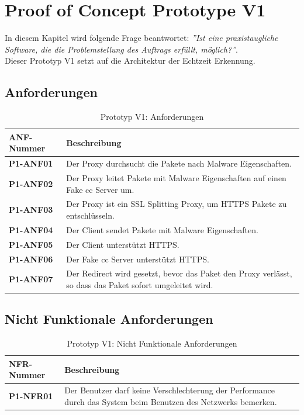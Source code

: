 \chapter{Proof of Concept Prototype V1}
\label{poc1:chapter}
In diesem Kapitel wird folgende Frage beantwortet: \textit{''Ist eine praxistaugliche Software, die die Problemstellung des Auftrags erfüllt, möglich?''}.\\

Dieser Prototyp V1 setzt auf die Architektur der Echtzeit Erkennung.


\begin{table}[H]
	\section{Anforderungen}
    \centering
	\begin{tabularx}{\textwidth}{| l | X |}
        \hline
        \textbf{ANF-Nummer} & \textbf{Beschreibung} \\ \hline
        \textbf{P1-ANF01} & Der Proxy durchsucht die Pakete nach Malware Eigenschaften. \\ \hline       
        \textbf{P1-ANF02} & Der Proxy leitet Pakete mit Malware Eigenschaften auf einen Fake \gls{cc} Server um. \\ \hline  
        \textbf{P1-ANF03} & Der Proxy ist ein SSL Splitting Proxy, um HTTPS Pakete zu entschlüsseln. \\ \hline
        \textbf{P1-ANF04} & Der Client sendet Pakete mit Malware Eigenschaften. \\ \hline       
        \textbf{P1-ANF05} & Der Client unterstützt HTTPS.  \\ \hline        
        \textbf{P1-ANF06} & Der Fake \gls{cc} Server unterstützt HTTPS.  \\ \hline  
        \textbf{P1-ANF07} & Der Redirect wird gesetzt, bevor das Paket den Proxy verlässt, so dass das Paket sofort umgeleitet wird. \\ \hline     
    \end{tabularx}
    \caption{Prototyp V1: Anforderungen}
\end{table}


\begin{table}[H]
	\section{Nicht Funktionale Anforderungen}
    \centering
	\begin{tabularx}{\textwidth}{| l | X |}
        \hline
        \textbf{NFR-Nummer} & \textbf{Beschreibung} \\ \hline
        \textbf{P1-NFR01} & Der Benutzer darf keine Verschlechterung der Performance durch das System beim Benutzen des Netzwerks bemerken. \\ \hline        
    \end{tabularx}
    \caption{Prototyp V1: Nicht Funktionale Anforderungen}
\end{table}
\newpage
